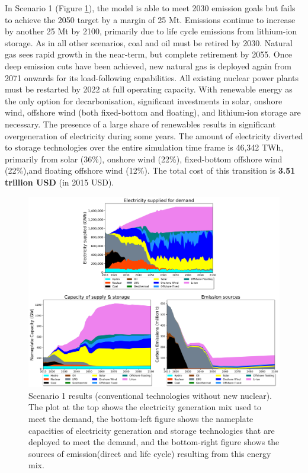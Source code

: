 In Scenario 1 (Figure \ref{scen1}), the model is able to meet 2030 emission goals but fails to achieve the 2050 target by a margin of 25 Mt. Emissions continue to increase by another 25 Mt by 2100, primarily due to life cycle emissions from lithium-ion storage. As in all other scenarios, coal and oil must be retired by 2030. Natural gas sees rapid growth in the near-term, but complete retirement by 2055. Once deep emission cuts have been achieved, new natural gas is deployed again from 2071 onwards for its load-following capabilities. All existing nuclear power plants must be restarted by 2022 at full operating capacity. With renewable energy as the only option for decarbonisation, significant investments in solar, onshore wind, offshore wind (both fixed-bottom and floating), and lithium-ion storage are necessary. The presence of a large share of renewables results in significant overgeneration of electricity during some years. The amount of electricity diverted to storage technologies over the entire simulation time frame is 46,342 TWh, primarily from solar (36\%), onshore wind (22\%), fixed-bottom offshore wind (22\%),and floating offshore wind (12\%). The total cost of this transition is \textbf{3.51 trillion USD} (in 2015 USD).

\begin{figure}[H] 
\centering
\includegraphics[scale=0.5]{figures/conv_nonuc}
\caption{Scenario 1 results (conventional technologies without new nuclear). The plot at the top shows the electricity generation mix used to meet the demand, the bottom-left figure shows the nameplate capacities of electricity generation and storage technologies that are deployed to meet the demand, and the bottom-right figure shows the sources of emission(direct and life cycle) resulting from this energy mix.}
\label{scen1}
\end{figure}

